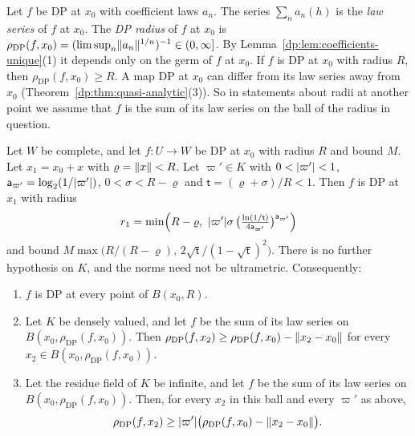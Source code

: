 \begin{definition}\label{dp:def:radius}
Let $f$ be DP at $x_0$ with coefficient laws $a_n$. The series $\sum_na_n(h)$ is the \emph{law series} of $f$ at $x_0$. The \emph{DP radius} of $f$ at $x_0$ is $\rho_{\mathrm{DP}}(f,x_0)=(\limsup_n\lVert a_n\rVert^{1/n})^{-1}\in(0,\infty]$. By Lemma~\ref{dp:lem:coefficients-unique}(1) it depends only on the germ of $f$ at $x_0$. If $f$ is DP at $x_0$ with radius $R$, then $\rho_{\mathrm{DP}}(f,x_0)\ge R$. A map DP at $x_0$ can differ from its law series away from $x_0$ (Theorem~\ref{dp:thm:quasi-analytic}(3)). So in statements about radii at another point we assume that $f$ is the sum of its law series on the ball of the radius in question.
\end{definition}

\begin{theorem}\label{dp:thm:whole-ball}
Let $W$ be complete, and let $f\colon U\to W$ be DP at $x_0$ with radius $R$ and bound $M$. Let $x_1=x_0+x$ with $\varrho=\lVert x\rVert<R$. Let $\varpi'\in K$ with $0<\lvert \varpi'\rvert<1$, $\mathsf a_{\varpi'}=\log_2(1/\lvert \varpi'\rvert)$, $0<\sigma<R-\varrho$ and $\mathsf t=(\varrho+\sigma)/R<1$. Then $f$ is DP at $x_1$ with radius
\begin{equation}\label{dp:4a:eq:radius}
 r_1=\min\Bigl(R-\varrho,\ \abs{\varpi'}\sigma\,\bigl(\tfrac{\ln(1/\mathsf t)}{4\mathsf a_{\varpi'}}\bigr)^{\mathsf a_{\varpi'}}\Bigr)
\end{equation}
and bound $M\max\bigl(R/(R-\varrho),\,2\sqrt{\mathsf t}/(1-\sqrt{\mathsf t})^2\bigr)$. There is no further hypothesis on $K$, and the norms need not be ultrametric. Consequently:
\begin{enumerate}
\item $f$ is DP at every point of $B(x_0,R)$.
\item Let $K$ be densely valued, and let $f$ be the sum of its law series on $B(x_0,\rho_{\mathrm{DP}}(f,x_0))$. Then $\rho_{\mathrm{DP}}(f,x_2)\ge\rho_{\mathrm{DP}}(f,x_0)-\lVert x_2-x_0\rVert$ for every $x_2\in B(x_0,\rho_{\mathrm{DP}}(f,x_0))$.
\item Let the residue field of $K$ be infinite, and let $f$ be the sum of its law series on $B(x_0,\rho_{\mathrm{DP}}(f,x_0))$. Then, for every $x_2$ in this ball and every $\varpi'$ as above,
\[
 \rho_{\mathrm{DP}}(f,x_2)\ge\lvert \varpi'\rvert\bigl(\rho_{\mathrm{DP}}(f,x_0)-\lVert x_2-x_0\rVert\bigr).
\]
\end{enumerate}
\end{theorem}

